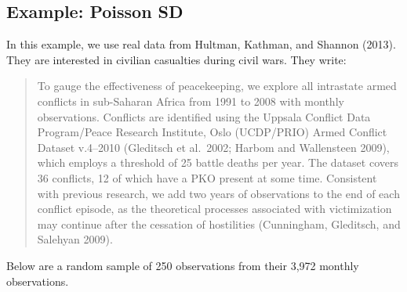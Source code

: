 \documentclass[
]{book}
\begin{document}
\hypertarget{example-poisson-sd}{%
\subsection{Example: Poisson SD}\label{example-poisson-sd}}

In this example, we use real data from Hultman, Kathman, and Shannon (2013). They are interested in civilian casualties during civil wars. They write:

\begin{quote}
To gauge the effectiveness of peacekeeping, we explore all intrastate armed conflicts in sub-Saharan Africa from 1991 to 2008 with monthly observations. Conflicts are identified using the Uppsala Conflict Data Program/Peace Research Institute, Oslo (UCDP/PRIO) Armed Conflict Dataset v.4--2010 (Gleditsch et al.~2002; Harbom and Wallensteen 2009), which employs a threshold of 25 battle deaths per year. The dataset covers 36 conflicts, 12 of which have a PKO present at some time. Consistent with previous research, we add two years of observations to the end of each conflict episode, as the theoretical processes associated with victimization may continue after the cessation of hostilities (Cunningham, Gleditsch, and Salehyan 2009).
\end{quote}

Below are a random sample of 250 observations from their 3,972 monthly observations.
\end{document}
